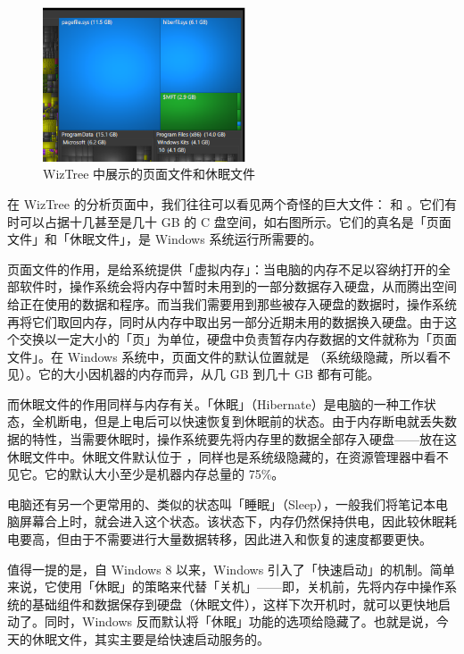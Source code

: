 {\begin{figure}
  \centering
  \vspace*{-.2cm}
  \includegraphics[width=6cm]{assets/advanced/Pagefile_and_hiberfil.png}
  \caption{WizTree 中展示的页面文件和休眠文件}
\end{figure}

在 WizTree 的分析页面中，我们往往可以看见两个奇怪的巨大文件： 和 。它们有时可以占据十几甚至是几十 GB 的 C 盘空间，如右图所示。它们的真名是「页面文件」和「休眠文件」，是 Windows 系统运行所需要的。

页面文件的作用，是给系统提供「虚拟内存」：当电脑的内存不足以容纳打开的全部软件时，操作系统会将内存中暂时未用到的一部分数据存入硬盘，从而腾出空间给正在使用的数据和程序。而当我们需要用到那些被存入硬盘的数据时，操作系统再将它们取回内存，同时从内存中取出另一部分近期未用的数据换入硬盘。由于这个交换以一定大小的「页」为单位，硬盘中负责暂存内存数据的文件就称为「页面文件」。在 Windows 系统中，页面文件的默认位置就是  （系统级隐藏，所以看不见）。它的大小因机器的内存而异，从几 GB 到几十 GB 都有可能。

而休眠文件的作用同样与内存有关。「休眠」（Hibernate）是电脑的一种工作状态，全机断电，但是上电后可以快速恢复到休眠前的状态。由于内存断电就丢失数据的特性，当需要休眠时，操作系统要先将内存里的数据全部存入硬盘——放在这休眠文件中。休眠文件默认位于 ，同样也是系统级隐藏的，在资源管理器中看不见它。它的默认大小至少是机器内存总量的 75\%。

\begin{note}
  电脑还有另一个更常用的、类似的状态叫「睡眠」（Sleep），一般我们将笔记本电脑屏幕合上时，就会进入这个状态。该状态下，内存仍然保持供电，因此较休眠耗电要高，但由于不需要进行大量数据转移，因此进入和恢复的速度都要更快。
\end{note}

值得一提的是，自 Windows 8 以来，Windows 引入了「快速启动」的机制。简单来说，它使用「休眠」的策略来代替「关机」——即，关机前，先将内存中操作系统的基础组件和数据保存到硬盘（休眠文件），这样下次开机时，就可以更快地启动了。同时，Windows 反而默认将「休眠」功能的选项给隐藏了。也就是说，今天的休眠文件，其实主要是给快速启动服务的。

}
